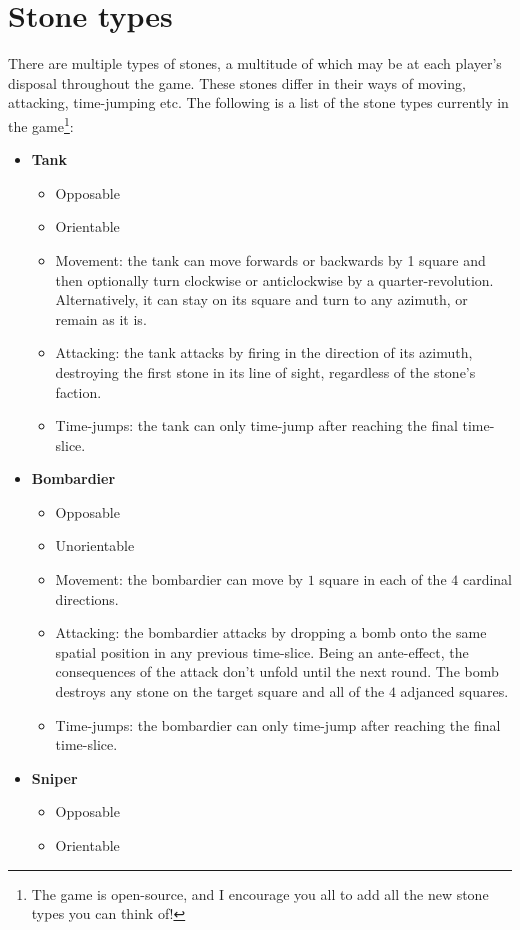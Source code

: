 \documentclass[12pt]{article}
\begin{document}
	
	\section{Stone types}\label{sec:stone types}
	There are multiple types of stones, a multitude of which may be at each player's disposal throughout the game. These stones differ in their ways of moving, attacking, time-jumping etc. The following is a list of the stone types currently in the game\footnote{The game is open-source, and I encourage you all to add all the new stone types you can think of!}:
	\begin{itemize}
	\item \textbf{Tank}
		\begin{itemize}
		\item Opposable
		\item Orientable
		\item Movement: the tank can move forwards or backwards by 1 square and then optionally turn clockwise or anticlockwise by a quarter-revolution. Alternatively, it can stay on its square and turn to any azimuth, or remain as it is.
		\item Attacking: the tank attacks by firing in the direction of its azimuth, destroying the first stone in its line of sight, regardless of the stone's faction.
		\item Time-jumps: the tank can only time-jump after reaching the final time-slice.
		\end{itemize}
	\item \textbf{Bombardier}
		\begin{itemize}
		\item Opposable
		\item Unorientable
		\item Movement: the bombardier can move by $1$ square in each of the $4$ cardinal directions.
		\item Attacking: the bombardier attacks by dropping a bomb onto the same spatial position in any previous time-slice. Being an ante-effect, the consequences of the attack don't unfold until the next round. The bomb destroys any stone on the target square and all of the $4$ adjanced squares.
		\item Time-jumps: the bombardier can only time-jump after reaching the final time-slice.
		\end{itemize}
	\item \textbf{Sniper}
		\begin{itemize}
		\item Opposable
		\item Orientable

\end{itemize}
\end{itemize}
\end{document}
